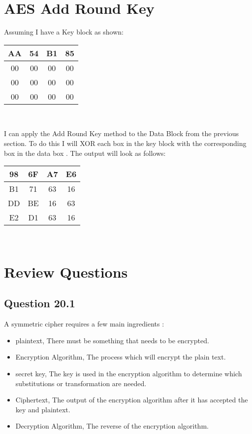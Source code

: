 \documentclass[14pt]{extarticle}
\begin{document}
\section{AES Add Round Key \cite{bblearn}}
Assuming I have a Key block as shown:\cite{bblearn}\\
\begin{center}
  \begin{tabular}{|c|c|c|c|}
    \hline
    AA & 54 & B1 & 85\\
    \hline
    00 & 00 & 00 & 00\\
    \hline
    00 & 00 & 00 & 00\\
    \hline
    00 & 00 & 00 & 00\\
    \hline
  \end{tabular}\\
\end{center}
I can apply the Add Round Key method to the Data Block from the previous section. To do this I will XOR each box in the key block with the corresponding box in the data box \cite[p.~651]{stallings}. The output will look as follows:\\
\begin{center}
  \begin{tabular}{|c|c|c|c|}
    \hline
    98 & 6F & A7 & E6\\
    \hline
    B1 & 71 & 63 & 16\\
    \hline
    DD & BE & 16 & 63\\
    \hline
    E2 & D1 & 63 & 16\\
    \hline
  \end{tabular}\\
\end{center}
\section{Review Questions}
\subsection{Question 20.1 \cite[p.~664]{stallings}}
A symmetric cipher requires a few main ingredients \cite[p.~638]{stallings}:
\begin{itemize}
  \item plaintext, There must be something that needs to be encrypted.
  \item Encryption Algorithm, The process which will encrypt the plain text.
  \item secret key, The key is used in the encryption algorithm to determine which substitutions or transformation are needed.
  \item Ciphertext, The output of the encryption algorithm after it has accepted the key and plaintext.
  \item Decryption Algorithm, The reverse of the encryption algorithm.
\end{itemize}
\end{document}
